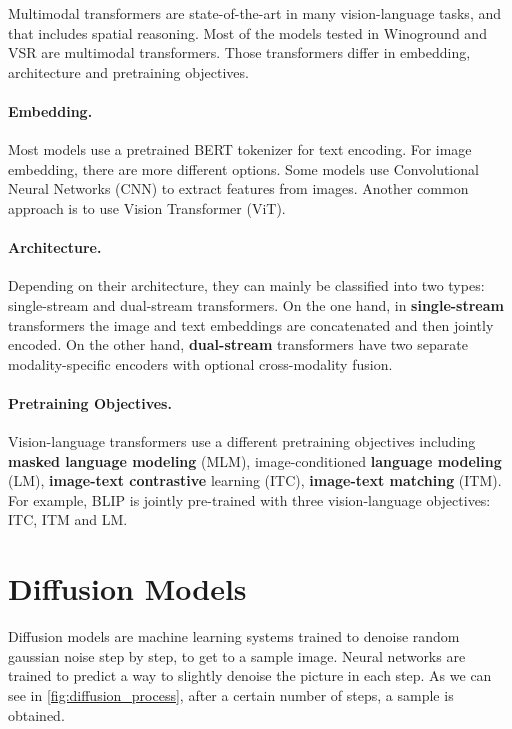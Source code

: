 Multimodal transformers are state-of-the-art in many vision-language tasks, and that includes spatial reasoning. Most of the models tested in Winoground \cite{thrush2022winoground} and VSR \cite{liu2022visual} are multimodal transformers. Those transformers differ in embedding, architecture and pretraining objectives.

\paragraph{Embedding.} Most models use a pretrained BERT tokenizer for text encoding. For image embedding, there are more different options. Some models use Convolutional Neural Networks (CNN) to extract features from images. Another common approach is to use Vision Transformer (ViT).

\paragraph{Architecture.} Depending on their architecture, they can mainly be classified into two types: single-stream and dual-stream transformers. On the one hand, in \textbf{single-stream} transformers the image and text embeddings are concatenated and then jointly encoded. On the other hand, \textbf{dual-stream} transformers have two separate modality-specific encoders with optional cross-modality fusion.

\paragraph{Pretraining Objectives.} Vision-language transformers use a different pretraining objectives including \textbf{masked language modeling} (MLM), image-conditioned \textbf{language modeling} (LM), \textbf{image-text contrastive} learning (ITC), \textbf{image-text matching} (ITM). For example, BLIP \cite{li2022blip} is jointly pre-trained with three vision-language objectives: ITC, ITM and LM.

\section{Diffusion Models} \label{sec:diffusion_models}

Diffusion models are machine learning systems trained to denoise random gaussian noise step by step, to get to a sample image. Neural networks are trained to predict a way to slightly denoise the picture in each step. As we can see in \cref{fig:diffusion_process}, after a certain number of steps, a sample is obtained.

